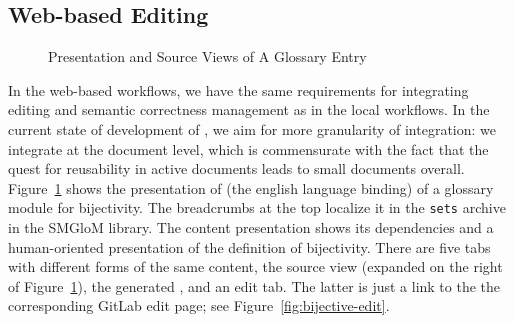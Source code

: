
\subsection{Web-based \sys Editing}\label{sec:web}

\begin{figure}[ht]\centering
  \quad
  \caption{Presentation and Source Views of A Glossary Entry}\label{fig:bijective}
\end{figure}

In the web-based workflows, we have the same requirements for integrating editing and
semantic correctness management as in the local workflows. In the current state of
development of \sys, we aim for more granularity of integration: we integrate at the
document level, which is commensurate with the fact that the quest for reusability in
active documents leads to small documents overall. Figure~\ref{fig:bijective} shows the
presentation of (the english language binding) of a glossary module for bijectivity. The
breadcrumbs at the top localize it in the \texttt{sets} archive in the \textsf{SMGloM}
library. The content presentation shows its dependencies and a human-oriented presentation
of the definition of bijectivity. There are five tabs with different forms of the same
content, the source view (expanded on the right of Figure~\ref{fig:bijective}), the
generated \omdoc, and an edit tab. The latter is just a link to the the corresponding
GitLab edit page; see Figure~\ref{fig:bijective-edit}.

